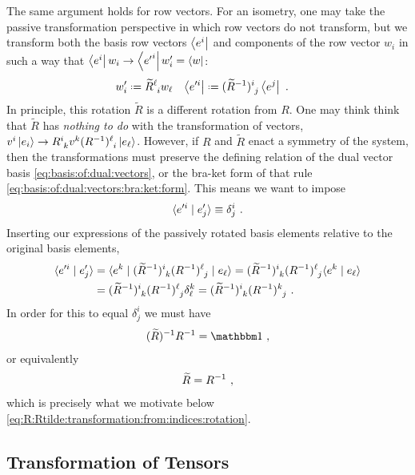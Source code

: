 \documentclass[12pt, oneside]{report}    %
\begin{document}
The same argument holds for row vectors. For an isometry, one may take the passive transformation perspective in which row vectors do not transform, but we transform both the basis row vectors $\left\langle e^i\right|$ and components of the row vector $w_i$ in such a way that $\left\langle e^i\right|w_i \to \left\langle{e'}^i\right|w'_i = \left\langle w\right|$: 
\begin{align}
    w'_i &\defeq \tilde R\aij{\ell}{i} w_\ell
    &
    \bra{e'^i} &\defeq  (\tilde{R}\inv)\aij{i}{j}\bra{e^j} \ .
    \label{eq:passive:transformation:of:row:vector:and:basis}
\end{align}
In principle, this rotation $\tilde R$ is a different rotation from $R$. One may think think that $\tilde R$ has \emph{nothing to do} with the transformation of vectors, $v^i\ket{e_i} \to R\aij{i}{k}v^k(R\inv)\aij{\ell}{i}\ket{e_\ell}$. However, if $R$ and $\tilde R$ enact a symmetry of the system, then the transformations must preserve the defining relation of the dual vector basis \eqref{eq:basis:of:dual:vectors}, or the bra-ket form of that rule \eqref{eq:basis:of:dual:vectors:bra:ket:form}. This means we want to impose
\begin{align}
    \langle e'^i \mid e'_j \rangle \equiv \delta^i_j \ .
    \label{eq:basis:transform:under:rotation}
\end{align}
Inserting our expressions of the passively rotated basis elements relative to the original basis elements,
\begin{align}
    \la e'^i \mid e'_j \ra &= 
    \la e^k \mid (\tilde{R}\inv)\aij{i}{k} (R\inv)\aij{\ell}{j} \mid e_\ell \ra
    =
    (\tilde{R}\inv)\aij{i}{k} (R\inv)\aij{\ell}{j} \la e^k \mid e_\ell \ra
    \\
    &=
    (\tilde{R}\inv)\aij{i}{k} (R\inv)\aij{\ell}{j} \delta^k_\ell
    =
    (\tilde{R}\inv)\aij{i}{k} (R\inv)\aij{k}{j} \ .
\end{align}
In order for this to equal $\delta^i_j$ we must have
\begin{align}
    (\tilde R)\inv R\inv = \one \ ,
\end{align}
or equivalently
\begin{align}
    \widetilde R = R^{-1} \ ,
\end{align}
which is precisely what we motivate below \eqref{eq:R:Rtilde:transformation:from:indices:rotation}. 


\subsection{Transformation of Tensors}
\end{document}
